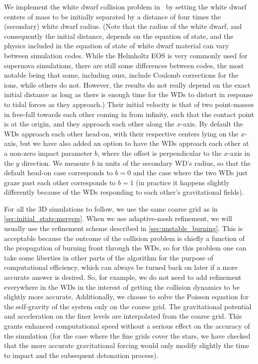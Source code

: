 \documentclass[12pt]{article}
\begin{document}
We implement the white dwarf collision problem in \castro\ by setting the white dwarf
centers of mass to be initially separated by a distance of four times
the (secondary) white dwarf radius. (Note that the radius of the white dwarf, and
consequently the initial distance, depends on the equation of state, and the physics included in
the equation of state of white dwarf material can vary between simulation codes. While
the Helmholtz EOS is very commonly used for supernova simulations, there are still some differences between codes,
the most notable being that some, including ours, include Coulomb corrections for the
ions, while others do not. However, the results do not really depend on the
exact initial distance as long as there is enough time for the WDs to distort in
response to tidal forces as they approach.) Their initial velocity is that of
two point-masses in free-fall towards each other coming in from infinity, such that
the contact point is at the origin, and they approach each other along the $x$-axis.
By default the WDs approach each other head-on, with their respective centers
lying on the $x$-axis, but we have also added an option
to have the WDs approach each other at a non-zero impact parameter $b$, where the
offset is perpendicular to the $x$-axis in the $y$ direction. We measure
$b$ in units of the secondary WD's radius, so that the default head-on case
corresponds to $b = 0$ and the case where the two WDs just graze past each other
corresponds to $b = 1$ (in practice it happens slightly differently because
of the WDs responding to each other's gravitational fields).

For all the 3D simulations to follow, we use the same coarse grid as in \autoref{sec:initial_state:mergers}.
When we use adaptive-mesh refinement, we will usually
use the refinement scheme described in \autoref{sec:unstable_burning}. This is
acceptable because the outcome of the collision problem is chiefly a function
of the propagation of burning front through the WDs, so for this problem one
can take some liberties in other parts of the algorithm for the purpose of
computational efficiency, which can always be turned back on later if a more
accurate answer is desired. So, for example, we do not need to add refinement
everywhere in the WDs in the interest of getting the collision dynamics to be
slightly more accurate. Additionally, we choose to solve the Poisson equation
for the self-gravity of the system only on the coarse grid. The gravitational
potential and acceleration on the finer levels are interpolated from the coarse
grid. This grants enhanced computational speed without a serious effect on the
accuracy of the simulation (for the case where the fine grids cover the stars,
we have checked that the more accurate gravitational forcing would only modify
slightly the time to impact and the subsequent detonation process).
\end{document}
